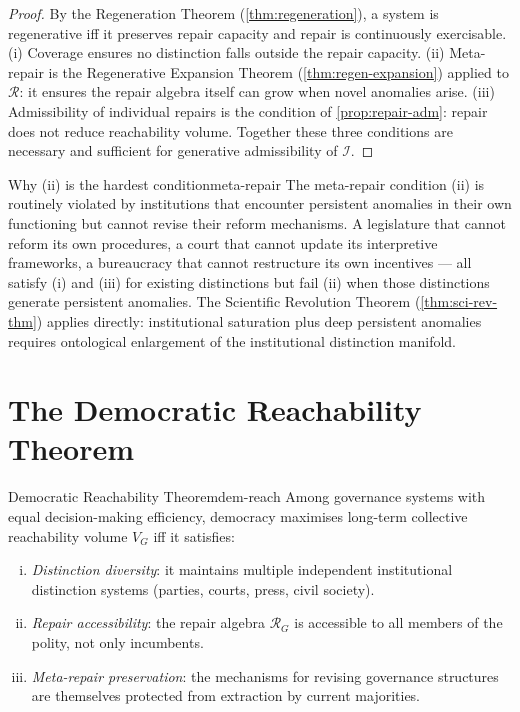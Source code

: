 \documentclass[12pt,twoside,openright]{book}
\begin{document}
\begin{proof}
  By the Regeneration Theorem (\cref{thm:regeneration}),
  a system is regenerative iff it preserves repair
  capacity and repair is continuously exercisable.
  (i) Coverage ensures no distinction falls outside
  the repair capacity.
  (ii) Meta-repair is the Regenerative Expansion Theorem
  (\cref{thm:regen-expansion}) applied to $\mathcal{R}$:
  it ensures the repair algebra itself can grow when
  novel anomalies arise.
  (iii) Admissibility of individual repairs is the
  condition of \cref{prop:repair-adm}: repair does not
  reduce reachability volume.
  Together these three conditions are necessary and
  sufficient for generative admissibility of
  $\mathcal{I}$.
\end{proof}

\begin{remark}{Why (ii) is the hardest condition}{meta-repair}
  The meta-repair condition (ii) is routinely violated
  by institutions that encounter persistent anomalies
  in their own functioning but cannot revise their
  reform mechanisms. A legislature that cannot reform
  its own procedures, a court that cannot update its
  interpretive frameworks, a bureaucracy that cannot
  restructure its own incentives — all satisfy (i)
  and (iii) for existing distinctions but fail (ii)
  when those distinctions generate persistent anomalies.
  The Scientific Revolution Theorem
  (\cref{thm:sci-rev-thm}) applies directly:
  institutional saturation plus deep persistent
  anomalies requires ontological enlargement of the
  institutional distinction manifold.
\end{remark}

\section{The Democratic Reachability Theorem}

\begin{theorem}{Democratic Reachability Theorem}{dem-reach}
  Among governance systems with equal decision-making
  efficiency, democracy maximises long-term collective
  reachability volume $V_G$ iff it satisfies:
  \begin{enumerate}[(i)]
    \item \emph{Distinction diversity}: it maintains
          multiple independent institutional distinction
          systems (parties, courts, press, civil society).
    \item \emph{Repair accessibility}: the repair
          algebra $\mathcal{R}_G$ is accessible to
          all members of the polity, not only incumbents.
    \item \emph{Meta-repair preservation}: the
          mechanisms for revising governance structures
          are themselves protected from extraction
          by current majorities.
  \end{enumerate}
\end{theorem}
\end{document}
